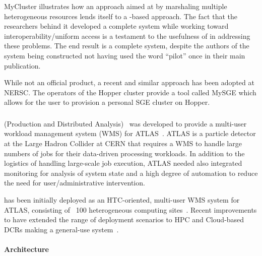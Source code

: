 \documentclass{sig-alternate}
\begin{document}
MyCluster illustrates how an approach aimed at 
by marshaling multiple heterogeneous resources lends itself to a \pilot-based approach. The fact that the researchers behind
it developed a complete \pilot system while working toward
interoperability/uniform access is a testament to the usefulness of \pilots in
addressing these problems. The end result is a complete \pilot system, despite
the authors of the system being constructed not having used the word ``pilot'' once in their main publication.

While not an official product, a recent and similar approach has been adopted
at NERSC. The operators of the Hopper cluster provide a tool called MySGE which
allows for the user to provision a personal SGE cluster on Hopper.

%
%
\subsubsection{\panda}
\label{sec:panda}

\panda (Production and Distributed Analysis)~\cite{1742-6596-331-7-072069} was
developed to provide a multi-user workload management system (WMS) for
ATLAS~\cite{aad2008atlas}. ATLAS is a particle detector at the Large Hadron
Collider at CERN that requires a WMS to handle large numbers of jobs for their
data-driven processing workloads. In addition to the logistics of handling
large-scale job execution, ATLAS needed also integrated monitoring for analysis
of system state and a high degree of automation to reduce the need for
user/administrative intervention.

\panda has been initially deployed as an HTC-oriented, multi-user WMS system
for ATLAS, consisting of ~100 heterogeneous computing
sites~\cite{maeno_pd2p:_2012}. Recent improvements to \panda have extended the
range of deployment scenarios to HPC and Cloud-based DCRs making \panda a
general-use \pilot system~\cite{nilsson2012recent}.

\paragraph{Architecture}
\end{document}
